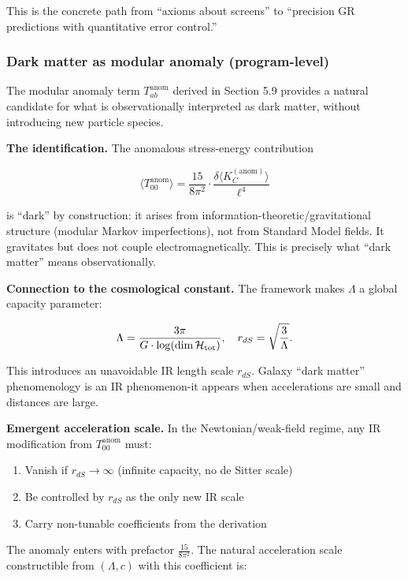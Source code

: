 \documentclass[11pt,a4paper]{article}
\theoremstyle{remark}
\providecommand{\tightlist}{%
  \setlength{\itemsep}{0pt}\setlength{\parskip}{0pt}}
\begin{document}
This is the concrete path from ``axioms about screens'' to ``precision GR
predictions with quantitative error control.''

\subsubsection{Dark matter as modular anomaly (program-level)}\label{dark-matter-as-modular-anomaly-program-level}

The modular anomaly term \(T_{ab}^{\mathrm{anom}}\) derived in Section 5.9 provides
a natural candidate for what is observationally interpreted as dark matter,
without introducing new particle species.

\textbf{The identification.} The anomalous stress-energy contribution

\[
\langle T_{00}^{\mathrm{anom}} \rangle
= \frac{15}{8\pi^2} \cdot \frac{\delta \langle K_C^{\mathrm{(anom)}} \rangle}{\ell^4}
\]

is ``dark'' by construction: it arises from information-theoretic/gravitational
structure (modular Markov imperfections), not from Standard Model fields. It
gravitates but does not couple electromagnetically. This is precisely what
``dark matter'' means observationally.

\textbf{Connection to the cosmological constant.} The framework makes \(\Lambda\) a
global capacity parameter:

\[
\Lambda = \frac{3\pi}{G \cdot \log(\dim \mathcal{H}_{\rm tot})},
\quad
r_{dS} = \sqrt{\frac{3}{\Lambda}}.
\]

This introduces an unavoidable IR length scale \(r_{dS}\). Galaxy ``dark matter''
phenomenology is an IR phenomenon-it appears when accelerations are small and
distances are large.

\textbf{Emergent acceleration scale.} In the Newtonian/weak-field regime, any
IR modification from \(T_{00}^{\mathrm{anom}}\) must:

\begin{enumerate}
\def\labelenumi{\arabic{enumi}.}
\tightlist
\item
  Vanish if \(r_{dS} \to \infty\) (infinite capacity, no de Sitter scale)
\item
  Be controlled by \(r_{dS}\) as the only new IR scale
\item
  Carry non-tunable coefficients from the derivation
\end{enumerate}

The anomaly enters with prefactor \(\frac{15}{8\pi^2}\). The natural acceleration
scale constructible from \((\Lambda, c)\) with this coefficient is:
\end{document}
